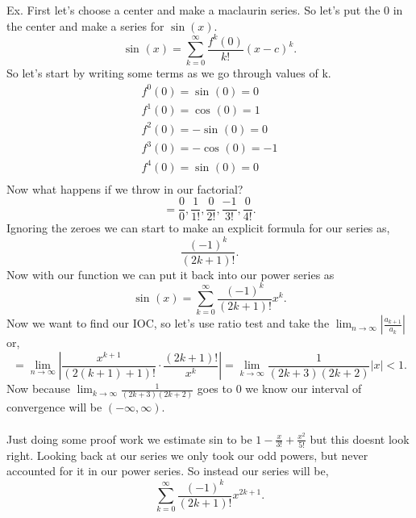 \documentclass[a4paper]{article}
\begin{document}
\begin{exampleblock}{Ex.}
	First let's choose a center and make a maclaurin series. So let's put the 0 in the center and make a series for $ \sin\left( x \right)  $.
	\[
	\sin^{  } \left( x \right) = \sum_{ k=0 } ^{ \infty } \frac{ f^{ k }\left( 0 \right)  }{ k! }\left( x-c \right) ^{ k }
	.\] 
	So let's start by writing some terms as we go through values of k. 
	\begin{gather*}
	f^{ 0 }\left( 0 \right) =\sin^{  } \left( 0 \right) =0 \\
	f^{ 1 }\left( 0 \right) =\cos^{  } \left( 0 \right) =1 \\
	f^{ 2 }\left( 0 \right) =-\sin^{  } \left( 0 \right) =0 \\
	f^{ 3 }\left( 0 \right) =-\cos^{  } \left( 0 \right) =-1 \\
	f^{ 4 }\left( 0 \right) =\sin^{  } \left( 0 \right) =0 \\
	\end{gather*}
	Now what happens if we throw in our factorial?
	\[
	=\frac{ 0 }{ 0 } , \frac{ 1 }{ 1! }, \frac{ 0 }{ 2! }, \frac{ -1 }{ 3! }, \frac{ 0 }{ 4! }
	.\] 
	Ignoring the zeroes we can start to make an explicit formula for our series as,
	\[
	\frac{ \left( -1 \right) ^{ k } }{ \left( 2k+1 \right) ! }
	.\] 
	Now with our function we can put it back into our power series as
	\[
	\sin^{  } \left( x \right) =\sum_{ k=0 } ^{ \infty } \frac{ \left( -1 \right) ^{ k } }{ \left( 2k+1 \right) ! }x^{ k }
	.\] 
	Now we want to find our IOC, so let's use ratio test and take the $ \lim_{ n \to \infty} \left| \frac{ a_{ k+1 } }{ a_k } \right| $ or,
	\[
	=\lim_{ n \to \infty} \left| \frac{ x^{ k+1 } }{ \left( 2\left( k+1 \right) +1 \right) ! }\cdot \frac{ \left( 2k+1 \right) ! }{ x^{ k } } \right| = \lim_{ k \to \infty} \frac{ 1 }{ \left( 2k+3 \right) \left( 2k+2 \right)  } \left| x \right|<1
	.\] 
	Now because $ \lim_{ k \to \infty} \frac{ 1 }{ \left( 2k+3 \right) \left( 2k+2 \right)  }  $ goes to 0 we know our interval of convergence will be $ \left( -\infty,\infty \right)  $.  \\ \\ 
	Just doing some proof work we estimate sin to be $ 1-\frac{ x }{ 3! } +\frac{ x^2 }{ 5! }  $ but this doesnt look right. Looking back at our series we only took our odd powers, but never accounted for it in our power series. So instead our series will be,
	\[
	\sum_{ k=0 } ^{ \infty } \frac{ \left( -1 \right) ^{ k } }{ \left( 2k+1 \right) ! }x^{ 2k+1 }
	.\] 

\end{exampleblock}
\end{document}
